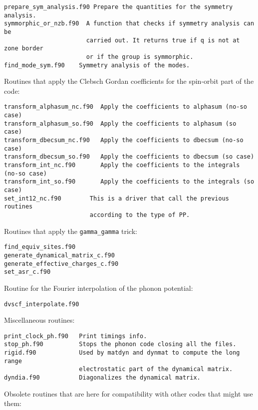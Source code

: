 \documentclass[12pt,a4paper]{article}
\begin{document}
\begin{verbatim}
prepare_sym_analysis.f90 Prepare the quantities for the symmetry analysis.
symmorphic_or_nzb.f90  A function that checks if symmetry analysis can be
                       carried out. It returns true if q is not at zone border
                       or if the group is symmorphic.
find_mode_sym.f90    Symmetry analysis of the modes.              
\end{verbatim}

Routines that apply the Clebsch Gordan coefficients for the spin-orbit
part of the code:

\begin{verbatim}
transform_alphasum_nc.f90  Apply the coefficients to alphasum (no-so case) 
transform_alphasum_so.f90  Apply the coefficients to alphasum (so case)
transform_dbecsum_nc.f90   Apply the coefficients to dbecsum (no-so case)
transform_dbecsum_so.f90   Apply the coefficients to dbecsum (so case)
transform_int_nc.f90       Apply the coefficients to the integrals (no-so case)
transform_int_so.f90       Apply the coefficients to the integrals (so case)
set_int12_nc.f90        This is a driver that call the previous routines
                        according to the type of PP.
\end{verbatim}

Routines that apply the \texttt{gamma\_gamma} trick:

\begin{verbatim}
find_equiv_sites.f90              
generate_dynamical_matrix_c.f90   
generate_effective_charges_c.f90 
set_asr_c.f90
\end{verbatim}

Routine for the Fourier interpolation of the phonon potential:

\begin{verbatim}
dvscf_interpolate.f90
\end{verbatim}

Miscellaneous routines:

\begin{verbatim}
print_clock_ph.f90   Print timings info.
stop_ph.f90          Stops the phonon code closing all the files.
rigid.f90            Used by matdyn and dynmat to compute the long range
                     electrostatic part of the dynamical matrix.
dyndia.f90           Diagonalizes the dynamical matrix.                        
\end{verbatim}

Obsolete routines that are here for compatibility with other codes that
might use them:
\end{document}
